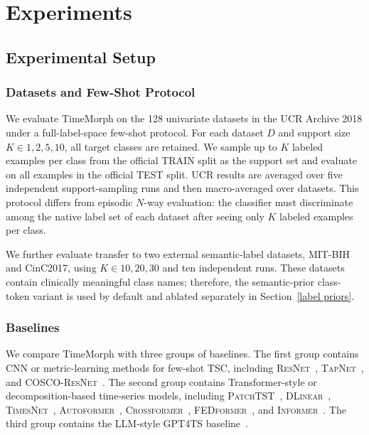 \documentclass[10pt,journal,compsoc]{IEEEtran}
\begin{document}
\section{Experiments}
\label{sec:experiments}

\subsection{Experimental Setup}

\subsubsection{Datasets and Few-Shot Protocol}
We evaluate TimeMorph on the 128 univariate datasets in the UCR Archive 2018 under a full-label-space few-shot protocol.
For each dataset $D$ and support size $K\in{1,2,5,10}$, all target classes are retained.
We sample up to $K$ labeled examples per class from the official TRAIN split as the support set and evaluate on all examples in the official TEST split.
UCR results are averaged over five independent support-sampling runs and then macro-averaged over datasets.
This protocol differs from episodic $N$-way evaluation: the classifier must discriminate among the native label set of each dataset after seeing only $K$ labeled examples per class.

We further evaluate transfer to two external semantic-label datasets, MIT-BIH and CinC2017, using $K\in{10,20,30}$ and ten independent runs.
These datasets contain clinically meaningful class names; therefore, the semantic-prior class-token variant is used by default and ablated separately in Section~\ref{label priors}.

\subsubsection{Baselines}
We compare TimeMorph with three groups of baselines.
The first group contains CNN or metric-learning methods for few-shot TSC, including \textsc{ResNet}~\cite{wang2017time}, \textsc{TapNet}~\cite{yoon2019tapnet}, and \textsc{COSCO-ResNet}~\cite{barreda2024cosco}.
The second group contains Transformer-style or decomposition-based time-series models, including \textsc{PatchTST}~\cite{nie2023patchtst}, \textsc{DLinear}~\cite{zeng2023transformers}, \textsc{TimesNet}~\cite{wu2023timesnet}, \textsc{Autoformer}~\cite{wu2021autoformer}, \textsc{Crossformer}~\cite{zhang2023crossformer}, \textsc{FEDformer}~\cite{zhou2022fedformer}, and \textsc{Informer}~\cite{zhou2021informer}.
The third group contains the LLM-style \textsc{GPT4TS} baseline~\cite{zhou2023onefitsall}.
\end{document}
